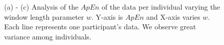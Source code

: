 \documentclass{llncs}
\begin{document}
  \begin{figure}[h]
    \centering
    \hfill
    \hfill

    \caption{(a) - (c) Analysis of the $ApEn$ of the data per individual varying the window length parameter $w$. Y-axis is $ApEn$ and X-axis varies $w$. Each line represents one participant's data. We observe great variance among individuals.}
    \label{fig:individual_entropy}

  \end{figure}
\end{document}
